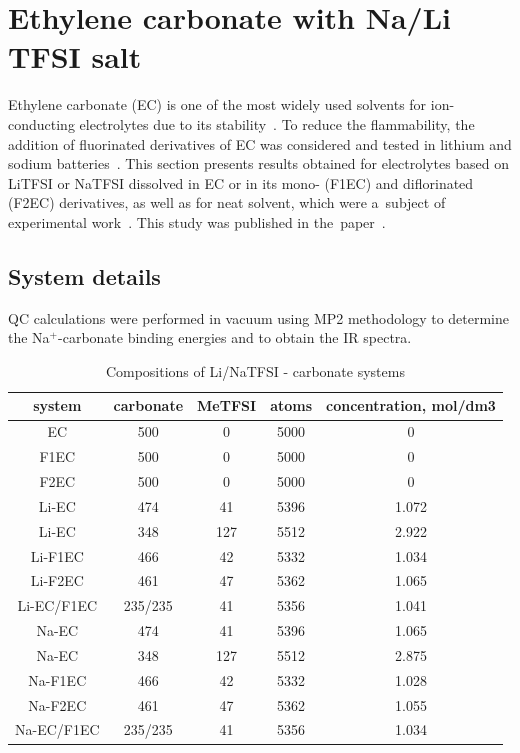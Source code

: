 \section{Ethylene carbonate with Na/Li TFSI salt}
\label{section:carbonates-structural}

Ethylene carbonate (EC) is one of the most widely used solvents for ion-conducting electrolytes due to its stability~\cite{lib-review}. To reduce the flammability, the addition of fluorinated derivatives of EC was considered and tested in lithium and sodium batteries~\cite{fluorination-1,fluorination-2,fluorination-3,fluorination-4}. This section presents results obtained for electrolytes based on LiTFSI or NaTFSI dissolved in EC or in its mono- (F1EC) and diflorinated (F2EC) derivatives, as well as for neat solvent, which were a~subject of experimental work~\cite{fluorination-2}. This study was published in the~paper~\cite{carbonates}.

\subsection{System details}

QC calculations were performed in vacuum using MP2 methodology to determine the Na$^{+}$-carbonate binding energies and to obtain the IR spectra. 

\begin{table}[ht]
    \centering
    \caption{Compositions of Li/NaTFSI - carbonate systems}
    \label{tab:carbonates-compositions}
\begin{tabular}{ccccc}
\toprule
system     & carbonate & MeTFSI & atoms & concentration, mol/dm3 \\
\midrule
EC         & 500       & 0      & 5000  & 0                      \\
F1EC       & 500       & 0      & 5000  & 0                      \\
F2EC       & 500       & 0      & 5000  & 0                      \\
Li-EC      & 474       & 41     & 5396  & 1.072                  \\
Li-EC      & 348       & 127    & 5512  & 2.922                  \\
Li-F1EC    & 466       & 42     & 5332  & 1.034                  \\
Li-F2EC    & 461       & 47     & 5362  & 1.065                  \\
Li-EC/F1EC & 235/235   & 41     & 5356  & 1.041                  \\
Na-EC      & 474       & 41     & 5396  & 1.065                  \\
Na-EC      & 348       & 127    & 5512  & 2.875                  \\
Na-F1EC    & 466       & 42     & 5332  & 1.028                  \\
Na-F2EC    & 461       & 47     & 5362  & 1.055                  \\
Na-EC/F1EC & 235/235   & 41     & 5356  & 1.034                  \\
\bottomrule
\end{tabular}
\end{table}

